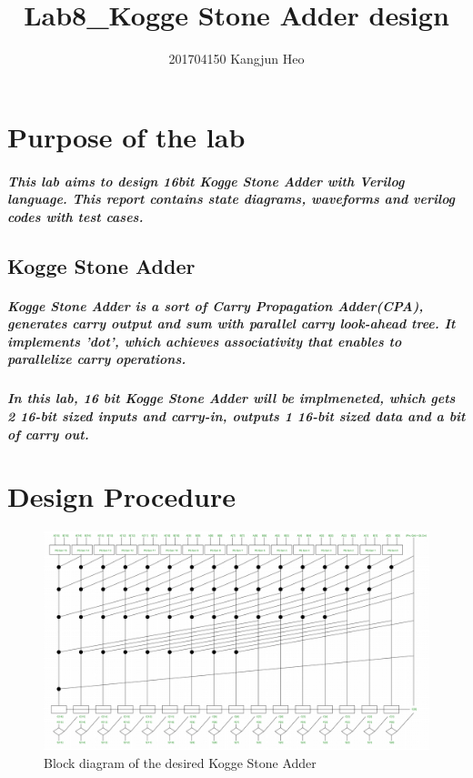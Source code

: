 \documentclass[a4paper]{report}
\title{Lab8\_Kogge Stone Adder design}
\author{201704150 Kangjun Heo}
\begin{document}
    \maketitle
    \tableofcontents

    \chapter{Purpose of the lab}

        \paragraph{This lab aims to design 16bit Kogge Stone Adder with Verilog language. This report contains state diagrams, waveforms and verilog codes with test cases.}
    
        \section{Kogge Stone Adder}

        \paragraph{\normalfont Kogge Stone Adder is a sort of Carry Propagation Adder(CPA), generates carry output and sum with parallel carry look-ahead tree. It implements 'dot', which achieves associativity that enables to parallelize carry operations.}

        \paragraph{\normalfont In this lab, 16 bit Kogge Stone Adder will be implmeneted, which gets 2 16-bit sized inputs and carry-in, outputs 1 16-bit sized data and a bit of carry out.}
        

    \chapter{Design Procedure}
        \begin{figure}[!htb]
            \centering
            \includegraphics[width=\textwidth]{diagrams/ksa_16b-1.png}
            \caption {Block diagram of the desired Kogge Stone Adder}
            \label{fig:wf-0}
        \end{figure}
        
\end{document}
